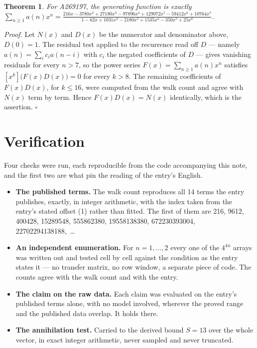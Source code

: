 \documentclass[11pt]{article}
\newtheorem{theorem}{Theorem}
\theoremstyle{definition}
\begin{document}
\begin{theorem} For A269197, the generating function is exactly $\sum_{n\ge 1} a(n)x^n = \frac{216x - 3780x^{2} + 27180x^{3} - 97896x^{4} + 129072x^{5} - 59412x^{6} + 10764x^{7}}{1 - 62x + 1031x^{2} - 2180x^{3} + 1535x^{4} - 350x^{5} + 25x^{6}}$.\end{theorem}

{\itshape Proof.} Let $N(x)$ and $D(x)$ be the numerator and denominator above, $D(0)=1$. The residual test applied to the recurrence read off $D$ --- namely $a(n) = \sum_i c_i a(n-i)$ with $c_i$ the negated coefficients of $D$ --- gives vanishing residuals for every $n > 7$, so the power series $F(x)=\sum_{n\ge 1}a(n)x^n$ satisfies $[x^k]\bigl(F(x)D(x)\bigr) = 0$ for every $k > 8$. The remaining coefficients of $F(x)D(x)$, for $k \le 16$, were computed from the walk count and agree with $N(x)$ term by term. Hence $F(x)D(x) = N(x)$ identically, which is the assertion. $\square$

\section{Verification}

Four checks were run, each reproducible from the code accompanying this note, and the first two are what pin the reading of the entry's English.

\begin{itemize}

\item {\bfseries The published terms.} The walk count reproduces all 14 terms the entry publishes, exactly, in integer arithmetic, with the index taken from the entry's stated offset (1) rather than fitted. The first of them are 216, 9612, 400428, 15289548, 555862380, 19558138380, 672230393004, 22702294138188,~\dots

\item {\bfseries An independent enumeration.} For $n = 1,\dots,2$ every one of the $4^{4n}$ arrays was written out and tested cell by cell against the condition as the entry states it --- no transfer matrix, no row window, a separate piece of code. The counts agree with the walk count and with the entry.

\item {\bfseries The claim on the raw data.} Each claim was evaluated on the entry's published terms alone, with no model involved, wherever the proved range and the published data overlap. It holds there.

\item {\bfseries The annihilation test.} Carried to the derived bound $S = 13$ over the whole vector, in exact integer arithmetic, never sampled and never truncated.

\end{itemize}
\end{document}

